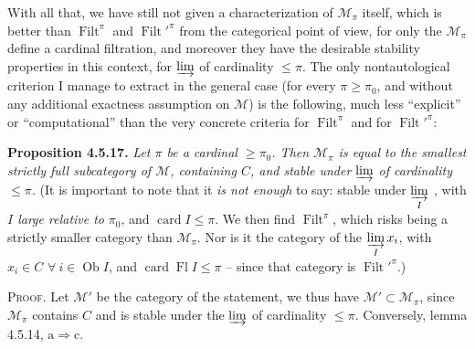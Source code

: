 \documentclass[11pt]{article}
\newcommand{\msp}[1]{\marginpar{\footnotesize [#1]}}
\newcommand{\Filt}{\operatorname{Filt}}
\newcommand{\card}{\operatorname{card}}
\newcommand{\Fl}{\operatorname{Fl}}
\newcommand{\Ob}{\operatorname{Ob}}
\begin{document}
With all that, we have still not given a characterization of $\mathcal{M}_{\pi}$ itself, which is better than $\Filt^{\pi}$ and $\Filt'^{\pi}$ from the categorical point of view, for only the $\mathcal{M}_{\pi}$ define a cardinal filtration, and moreover they have the desirable stability properties in this
\msp{page 138}
context, for $\varinjlim$ of cardinality $\leqslant \pi$. The only nontautological criterion I manage to extract in the general case (for every $\pi \geqslant \pi_0$, and without any additional exactness assumption on $\mathcal{M}$) is the following, much less ``explicit'' or ``computational'' than the very concrete criteria for $\Filt^{\pi}$ and for $\Filt'^{\pi}$:

\textbf{Proposition 4.5.17.} \textit{Let $\pi$ be a cardinal $\geqslant \pi_0$. Then $\mathcal{M}_{\pi}$ is equal to the smallest strictly full subcategory of $\mathcal{M}$, containing $C$, and stable under} $\varinjlim$ \textit{of cardinality $\leqslant \pi$.} (It is important to note that it \textit{is not enough} to say: stable under $\varinjlim\limits_{I}$ , with \textit{$I$ large relative to} $\pi_0$, and $\card I \leqslant \pi$. We then find $\Filt^{\pi}$, which risks being a strictly smaller category than $\mathcal{M}_{\pi}$. Nor is it the category of the $\varinjlim\limits_{I} x_i$, with $x_i \in C$ $\forall\ i \in \Ob I$, and $\card \Fl I \leqslant \pi$ -- since that category is $\Filt'^{\pi}$.)

\textsc{Proof}. Let $\mathcal{M}'$ be the category of the statement, we thus have $\mathcal{M}' \subset \mathcal{M}_{\pi}$, since $\mathcal{M}_{\pi}$ contains $C$ and is stable under the $\varinjlim$ of cardinality $\leqslant \pi$. Conversely, lemma 4.5.14, $\mathrm{a} \Longrightarrow \mathrm{c}$.
\end{document}
